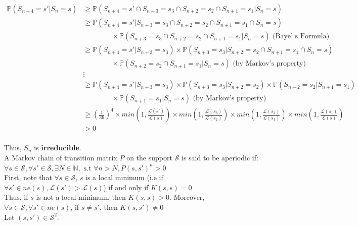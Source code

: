 $
\begin{aligned}
    \mathbb{P}(S_{n+4}=s'\vert S_n = s ) & \geqslant \mathbb{P}(S_{n+4} = s' \cap  S_{n+3}= s_3 \cap S_{n+2} = s_2 \cap S_{n+1} = s_1 \vert S_n = s) \\
    & \geqslant \mathbb{P}(S_{n+4} = s' \vert S_{n+3} = s_3 \cap S_{n+2} = s_2 \cap S_{n+1} = s_1 \cap S_n = s) \\
    & \quad\quad\quad\quad \times \mathbb{P}( S_{n+3} = s_3 \cap S_{n+2} = s_2 \cap S_{n+1} = s_1 \vert S_n = s) \text{  (Baye' s Formula)}\\
    & \geqslant \mathbb{P}(S_{n+4} = s' \vert S_{n+3} = s_3) \times \mathbb{P}( S_{n+3} = s_3 \vert S_{n+2} = s_2 \cap S_{n+1} = s_1 \cap S_n = s) \\
    & \quad\quad\quad\quad \times \mathbb{P}( S_{n+2} = s_2 \cap S_{n+1} = s_1 \vert S_n = s ) \text{ (by Markov's property)}\\
    & \vdots \\
    & \geqslant \mathbb{P}(S_{n+4} = s' \vert S_{n+3} = s_3) \times \mathbb{P}( S_{n+3} = s_3 \vert S_{n+2} = s_2) \times \mathbb{P}( S_{n+2} = s_2 \vert S_{n+1} = s_1) \\
    & \quad\quad\quad\quad \times \mathbb{P}( S_{n+1} = s_1 \vert S_n = s ) \text{ (by Markov's property)}\\
    & \geqslant (\frac{1}{36})^4 \times min (1, \frac{\mathcal{L}(s')}{\mathcal{L}(s)}) \times min (1, \frac{\mathcal{L}(s_3)}{\mathcal{L}(s_2)}) \times min (1, \frac{\mathcal{L}(s_2)}{\mathcal{L}(s_1)}) \times min (1, \frac{\mathcal{L}(s_1)}{\mathcal{L}(s)})  \\
    & > 0 \\
\end{aligned}
$

Thus, $S_n$ is \textbf{irreducible}.\\

A Markov chain of transition matrix $P$ on the support $\mathcal{S}$ is said to be aperiodic if: \\
$\forall s \in \mathcal{S}, \forall s' \in \mathcal{S}, \exists N \in \mathbb{N}, \text{ s.t } \forall n > N, P(s, s')^n >0 $ \cite[text]{bodineau2015modelisation}\\

First, note that $\forall s \in \mathcal{S}$,  $s$ is a local minimum (i.e if $\forall s' \in ne(s), \mathcal{L}(s') > \mathcal{L}(s) $) if and only if $K(s,s)=0$\\

Thus, if $s$ is not a local minimum, then $K(s, s)>0$. Moreover, $ \forall s \in \mathcal{S}, \forall s' \in ne(s)$, if $s\neq s'$, then $K(s, s') \neq 0 $\\[0.3cm]
Let $(s, s')  \in \mathcal{S}^2$. \\

